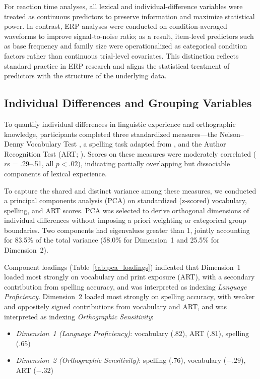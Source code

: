 \documentclass[utf8]{FrontiersinHarvard} %
\begin{document}
For reaction time analyses, all lexical and individual-difference variables were treated as continuous predictors to preserve information and maximize statistical power. In contrast, ERP analyses were conducted on condition-averaged waveforms to improve signal-to-noise ratio; as a result, item-level predictors such as base frequency and family size were operationalized as categorical condition factors rather than continuous trial-level covariates. This distinction reflects standard practice in ERP research and aligns the statistical treatment of predictors with the structure of the underlying data.

\subsection{Individual Differences and Grouping Variables}

To quantify individual differences in linguistic experience and orthographic knowledge, participants completed three standardized measures—the Nelson–Denny Vocabulary Test \citep{nelson1960}, a spelling task adapted from \citet{sawi2016}, and the Author Recognition Test (ART; \citealt{stanovich1989}). Scores on these measures were moderately correlated ($r$s = .29–.51, all $p < .02$), indicating partially overlapping but dissociable components of lexical experience.

To capture the shared and distinct variance among these measures, we conducted a principal components analysis (PCA) on standardized (z-scored) vocabulary, spelling, and ART scores. PCA was selected to derive orthogonal dimensions of individual differences without imposing a priori weighting or categorical group boundaries. Two components had eigenvalues greater than 1, jointly accounting for 83.5\% of the total variance (58.0\% for Dimension~1 and 25.5\% for Dimension~2).

Component loadings (Table~\ref{tab:pca_loadings}) indicated that Dimension~1 loaded most strongly on vocabulary and print exposure (ART), with a secondary contribution from spelling accuracy, and was interpreted as indexing \textit{Language Proficiency}. Dimension~2 loaded most strongly on spelling accuracy, with weaker and oppositely signed contributions from vocabulary and ART, and was interpreted as indexing \textit{Orthographic Sensitivity}:

\begin{itemize}
	\item[-] \textit{Dimension~1 (Language Proficiency)}: vocabulary (.82), ART (.81), spelling (.65)
	\item[-] \textit{Dimension~2 (Orthographic Sensitivity)}: spelling (.76), vocabulary ($- .29$), ART ($- .32$)
\end{itemize}
\end{document}
